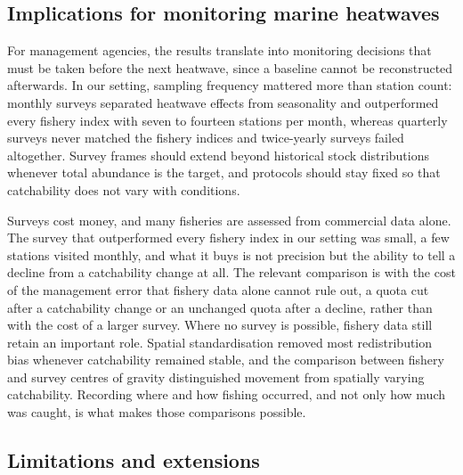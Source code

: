 \documentclass[11pt,a4paper]{article}
\begin{document}
\subsection{Implications for monitoring marine heatwaves}

For management agencies, the results translate into monitoring decisions that must be taken before the next heatwave, since a baseline cannot be reconstructed afterwards. In our setting, sampling frequency mattered more than station count: monthly surveys separated heatwave effects from seasonality and outperformed every fishery index with seven to fourteen stations per month, whereas quarterly surveys never matched the fishery indices and twice-yearly surveys failed altogether. Survey frames should extend beyond historical stock distributions whenever total abundance is the target, and protocols should stay fixed so that catchability does not vary with conditions.

Surveys cost money, and many fisheries are assessed from commercial data alone. The survey that outperformed every fishery index in our setting was small, a few stations visited monthly, and what it buys is not precision but the ability to tell a decline from a catchability change at all. The relevant comparison is with the cost of the management error that fishery data alone cannot rule out, a quota cut after a catchability change or an unchanged quota after a decline, rather than with the cost of a larger survey. Where no survey is possible, fishery data still retain an important role. Spatial standardisation removed most redistribution bias whenever catchability remained stable, and the comparison between fishery and survey centres of gravity distinguished movement from spatially varying catchability. Recording where and how fishing occurred, and not only how much was caught, is what makes those comparisons possible.

\subsection{Limitations and extensions}
\end{document}
